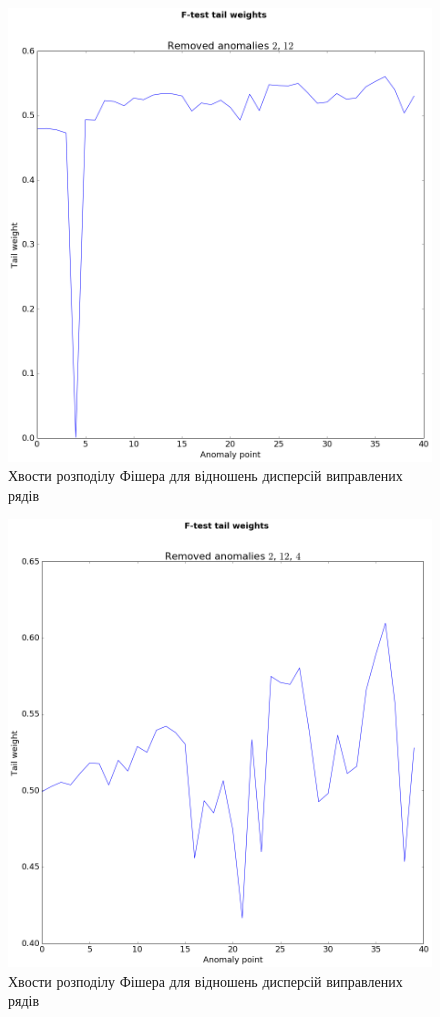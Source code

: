 \begin{figure}[h!]
  \centering
  \includegraphics[width=\textwidth]{Coursework_files/Coursework_18_1.png}
  \caption{Хвости розподілу Фішера для відношень дисперсій виправлених рядів}
  \label{fig:anomaly:fisher:1}
\end{figure}
\begin{figure}[h!]
  \centering
  \includegraphics[width=\textwidth]{Coursework_files/Coursework_18_2.png}
  \caption{Хвости розподілу Фішера для відношень дисперсій виправлених рядів}
  \label{fig:anomaly:fisher:2}
\end{figure}

